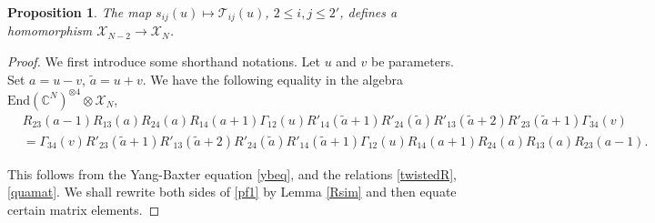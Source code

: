 \documentclass[11pt,reqno]{amsart}
\numberwithin{equation}{section}
\newtheorem{prop}[thm]{Proposition}
\theoremstyle{definition}
\theoremstyle{remark}
\newcommand{\beq}{\begin{equation}}
\newcommand{\eeq}{\end{equation}}
\newcommand{\bC}{\mathbb{C}}
\newcommand{\mc}{\mathcal}
\newcommand{\End}{\mathrm{End}}
\newcommand{\tl}{\tilde}
\newcommand{\lle}{\leqslant}
\newcommand{\scrX}{{\mathscr{X}}}
\begin{document}
\begin{prop}\label{embedB}
The map $s_{ij}(u)\mapsto \mc T_{ij}(u)$, $2\lle i,j\lle 2'$, defines a homomorphism $\scrX_{N-2}\to \scrX_{N}$.
\end{prop}
\begin{proof}We first introduce some shorthand notations. 
Let $u$ and $v$ be parameters. Set $a=u-v$, $\tl a=u+v$. We have the following equality in the algebra $\End(\bC^N)^{\otimes 4}\otimes \scrX_N$, 
\beq\label{pf1}
\begin{split}
&R_{23}(a-1)R_{13}(a)R_{24}(a)R_{14}(a+1)\Gamma_{12}(u)R'_{14}(\tl a+1)R'_{24}(\tl a)R'_{13}(\tl a+2)R'_{23}(\tl a+1)\Gamma_{34}(v)\\
&=\Gamma_{34}(v)R'_{23}(\tl a+1)R'_{13}(\tl a+2)R'_{24}(\tl a)R'_{14}(\tl a+1)\Gamma_{12}(u)R_{14}(a+1)R_{24}(a)R_{13}(a)R_{23}(a-1).
\end{split}
\eeq

This follows from the Yang-Baxter equation \eqref{ybeq}, and the relations \eqref{twistedR}, \eqref{quamat}. We shall rewrite both sides of \eqref{pf1} by Lemma \ref{Rsim} and then equate certain matrix elements.


\end{proof}
\end{document}
